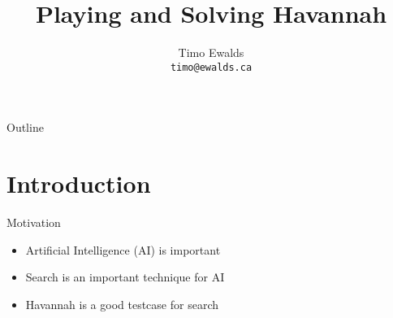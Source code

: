 \documentclass{beamer} %
\title{Playing and Solving Havannah}
\author[Timo Ewalds]{
	Timo Ewalds \\
	\texttt{timo@ewalds.ca}
}
\institute[UofA]{
	Department of Computing Science\\
	University of Alberta
}
\begin{document}
\begin{frame}[plain]
	\titlepage
\end{frame}






\begin{frame}{Outline}
\tableofcontents[hideallsubsections]
\end{frame}


\section{Introduction}

\begin{frame}{Motivation}
\begin{itemize}
	\item Artificial Intelligence (AI) is important
	\item Search is an important technique for AI
	\item Havannah is a good testcase for search
\end{itemize}
\end{frame}
\end{document}
